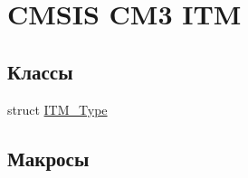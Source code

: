 \hypertarget{group___c_m_s_i_s___c_m3___i_t_m}{}\section{C\+M\+S\+IS C\+M3 I\+TM}
\label{group___c_m_s_i_s___c_m3___i_t_m}
\subsection*{Классы}
\begin{DoxyCompactItemize}
\item 
struct \mbox{\hyperlink{struct_i_t_m___type}{I\+T\+M\+\_\+\+Type}}
\end{DoxyCompactItemize}
\subsection*{Макросы}

